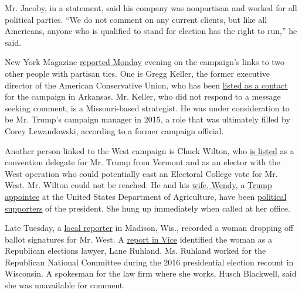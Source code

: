 Mr. Jacoby, in a statement, said his company was nonpartisan and worked
for all political parties. ``We do not comment on any current clients,
but like all Americans, anyone who is qualified to stand for election
has the right to run,'' he said.

New York Magazine
\href{https://nymag.com/intelligencer/2020/08/two-people-linked-to-kanye-wests-campaign-have-ties-to-gop.html}{reported
Monday} evening on the campaign's links to two other people with
partisan ties. One is Gregg Keller, the former executive director of the
American Conservative Union, who has been
\href{https://twitter.com/Bencjacobs/status/1290368066946203648}{listed
as a contact} for the campaign in Arkansas. Mr. Keller, who did not
respond to a message seeking comment, is a Missouri-based strategist. He
was under consideration to be Mr. Trump's campaign manager in 2015, a
role that was ultimately filled by Corey Lewandowski, according to a
former campaign official.

Another person linked to the West campaign is Chuck Wilton, who
\href{https://www.vtgop.org/presidential-convention}{is listed} as a
convention delegate for Mr. Trump from Vermont and as an elector with
the West operation who could potentially cast an Electoral College vote
for Mr. West. Mr. Wilton could not be reached. He and his
\href{https://www.fsa.usda.gov/state-offices/Vermont/index}{wife,
Wendy}, a
\href{https://www.fsa.usda.gov/state-offices/Vermont/news-releases/2017/trump-administration-appoints-wendy-wilton-to-serve-as-state-executive-director-for-usdas-farm-service-agency-in-vermont}{Trump
appointee} at the United States Department of Agriculture, have been
\href{https://vermontdailychronicle.com/2020/05/05/maga-vt-campaign-endorses-candidates-to-national-convention/}{political
supporters} of the president. She hung up immediately when called at her
office.

Late Tuesday, a
\href{https://twitter.com/mattsmith_news/status/1290770377627631617}{local
reporter} in Madison, Wis., recorded a woman dropping off ballot
signatures for Mr. West. A
\href{https://slack-redir.net/link?url=https\%3A\%2F\%2Fwww.vice.com\%2Fen_us\%2Farticle\%2Fakzy3b\%2Fa-well-connected-gop-strategist-is-helping-kanye-west-get-on-the-ballot-in-wisconsin}{report
in Vice} identified the woman as a Republican elections lawyer, Lane
Ruhland. Ms. Ruhland worked for the Republican National Committee during
the 2016 presidential election recount in Wisconsin. A spokesman for the
law firm where she works, Husch Blackwell, said she was unavailable for
comment.

